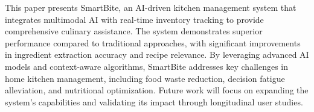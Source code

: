 \documentclass[conference]{IEEEtran}
\begin{document}
This paper presents SmartBite, an AI-driven kitchen management system that integrates multimodal AI with real-time inventory tracking to provide comprehensive culinary assistance. The system demonstrates superior performance compared to traditional approaches, with significant improvements in ingredient extraction accuracy and recipe relevance. By leveraging advanced AI models and context-aware algorithms, SmartBite addresses key challenges in home kitchen management, including food waste reduction, decision fatigue alleviation, and nutritional optimization. Future work will focus on expanding the system's capabilities and validating its impact through longitudinal user studies.



\end{document}
